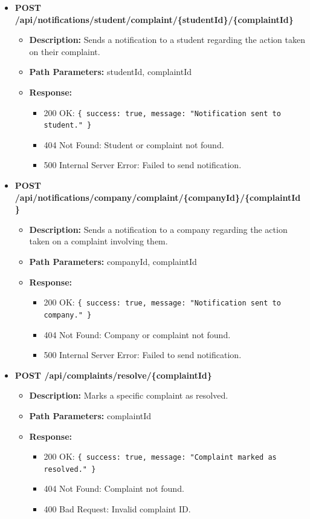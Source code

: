 \begin{itemize}
    \item \textbf{POST /api/notifications/student/complaint/\{studentId\}/\{complaintId\}}  
    \begin{itemize}
        \item \textbf{Description:} Sends a notification to a student regarding the action taken on their complaint.
        \item \textbf{Path Parameters:} studentId, complaintId  
        \item \textbf{Response:}
        \begin{itemize}
            \item 200 OK: \texttt{\{ success: true, message: "Notification sent to student." \}}
            \item 404 Not Found: Student or complaint not found.
            \item 500 Internal Server Error: Failed to send notification.
        \end{itemize}
    \end{itemize}


    \item \textbf{POST /api/notifications/company/complaint/\{companyId\}/\{complaintId\}}  
    \begin{itemize}
        \item \textbf{Description:} Sends a notification to a company regarding the action taken on a complaint involving them.
        \item \textbf{Path Parameters:} companyId, complaintId  
        \item \textbf{Response:}
        \begin{itemize}
            \item 200 OK: \texttt{\{ success: true, message: "Notification sent to company." \}}
            \item 404 Not Found: Company or complaint not found.
            \item 500 Internal Server Error: Failed to send notification.
        \end{itemize}
    \end{itemize}

    \item \textbf{POST /api/complaints/resolve/\{complaintId\}}  
    \begin{itemize}
        \item \textbf{Description:} Marks a specific complaint as resolved.
        \item \textbf{Path Parameters:} complaintId  
        \item \textbf{Response:}
        \begin{itemize}
            \item 200 OK: \texttt{\{ success: true, message: "Complaint marked as resolved." \}}
            \item 404 Not Found: Complaint not found.
            \item 400 Bad Request: Invalid complaint ID.
        \end{itemize}
    \end{itemize}


\end{itemize}
